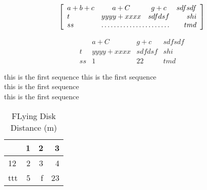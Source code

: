 \documentclass{article}
\begin{document}
  \begin{equation*}
    \left[
      \begin{array}{lccr}
        a+b+c & a+C & g+c & sdfsdf\\
        t & yyyy +xxxx & sdfdsf & shi\\
        ss & \hdotsfor{2}  & tmd\\
      \end{array}
    \right]
  \end{equation*}

  \begin{equation*}
    \begin{array}{r|lcr}
      & a+C & g+c & sdfsdf\\
      \hline
      t & yyyy +xxxx & sdfdsf & shi\\
      ss & 1  & 22  & tmd
    \end{array}
  \end{equation*}
  
  this is the first sequence 
  this is the first sequence \\
  this is the first sequence \\
  this is the first sequence \\
  \begin{table}[tbh]
  \caption{FLying Disk Distance (m)}
  \begin{center}
    \begin{tabular}{|l|r|r|r|}
      \hline
      & 1 & 2 & 3 \\
      \hline
      12 & 2 & 3 & 4 \\
      \hline
      ttt & 5 & f & 23 \\
      \hline
    \end{tabular}
  \end{center}
  \end{table}
\end{document}
